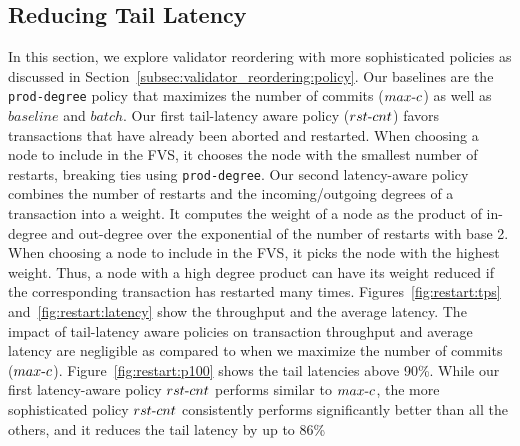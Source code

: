 \subsection{Reducing Tail Latency}

In this section, we explore validator reordering with more sophisticated policies as discussed in Section~\ref{subsec:validator_reordering:policy}.
Our baselines are the \texttt{prod-degree} policy that maximizes the number of commits ($max\hbox{-}c$) as well as $baseline$ and $batch$. 
Our first tail-latency aware policy ($rst\hbox{-}cnt$) favors transactions that have already been aborted and restarted. When choosing a node to include in the FVS, it chooses the node with the smallest number of restarts, breaking ties using \texttt{prod-degree}.
Our second latency-aware policy combines the number of restarts and the incoming/outgoing degrees of a transaction into a weight. It computes the weight of a node as
the product of in-degree and out-degree over the exponential of the number of
restarts with base 2. When choosing a node to include in the FVS, it picks the node with the highest weight. Thus, a node with a high degree product can have its weight reduced if the corresponding transaction has restarted many times.
Figures~\ref{fig:restart:tps} and~\ref{fig:restart:latency} show the throughput
and the average latency. The impact of tail-latency aware policies on transaction throughput and average latency are negligible as compared to when we maximize the number of commits ($max\hbox{-}c$).
Figure~\ref{fig:restart:p100} shows the 
tail latencies above 90\%. 
While our first latency-aware policy $rst\hbox{-}cnt$ performs similar to $max\hbox{-}c$, the more sophisticated policy $rst\hbox{-}cnt$ consistently performs significantly better than all the others, and it reduces the tail latency by up to 86\%


